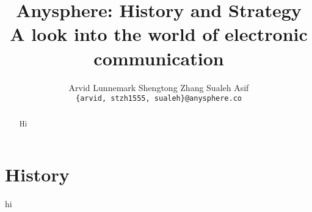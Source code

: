 \documentclass[sigconf, nonacm, balance=false, natbib=false]{acmart}
\title{\textbf{Anysphere: History and Strategy} \\ \vspace{0.4cm} {\huge \normalfont A look into the world of electronic communication}}
\date{\dateinfo}
\author{Arvid Lunnemark \hspace{0.7cm} Shengtong Zhang \hspace{0.7cm} Sualeh Asif \\ \vspace{0.1cm} \nolinkurl{{arvid, stzh1555, sualeh}@anysphere.co} \\ \vspace{0.4cm} \dateinfo}
\begin{document}
\pagecolor{pagecolor}

\begin{abstract}
    Hi
\end{abstract}

\maketitle

\tableofcontents

\section{History}

hi

\printbibliography
\end{document}
